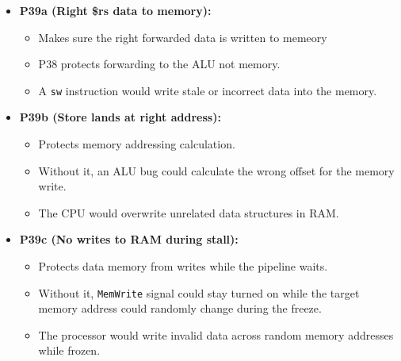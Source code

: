 \documentclass[11pt]{article}
\begin{document}
\begin{itemize}

    \item \textbf{P39a (Right \$rs data to memory):} 
    \begin{itemize}
        \item Makes sure the right forwarded data is written to memeory
        \item P38 protects forwarding to the ALU not memory.
        \item A \texttt{sw} instruction would write stale or incorrect data into the memory.
    \end{itemize}

    \item \textbf{P39b (Store lands at right address):} 
    \begin{itemize}
        \item Protects memory addressing calculation.
        \item Without it, an ALU bug could calculate the wrong offset for the memory write.
        \item The CPU would overwrite unrelated data structures in RAM.
    \end{itemize}

    \item \textbf{P39c (No writes to RAM during stall):} 
    \begin{itemize}
        \item Protects data memory from writes while the pipeline waits.
        \item Without it, \texttt{MemWrite} signal could stay turned on while the target memory address could randomly change during the freeze.
        \item The processor would write invalid data across random memory addresses while frozen.
    \end{itemize}
\end{itemize}
\end{document}
